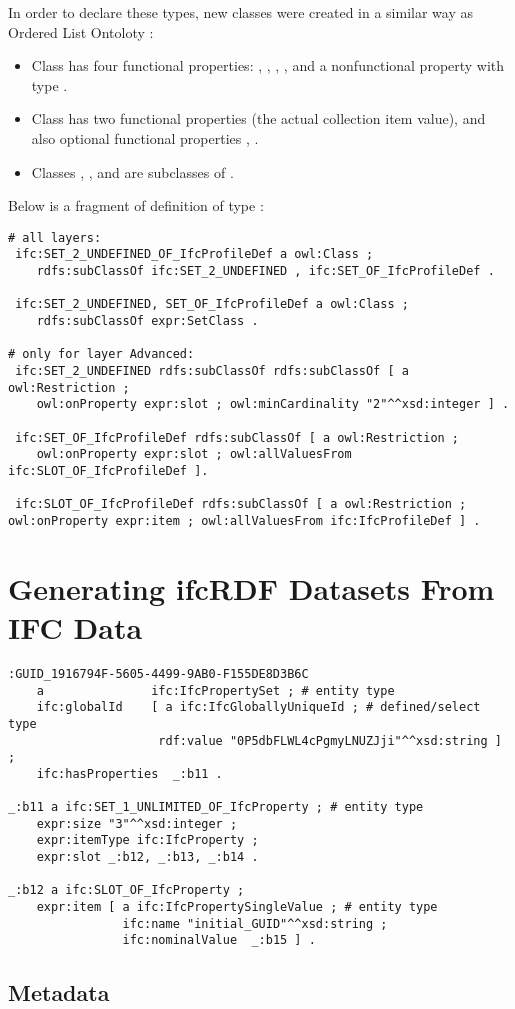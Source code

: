 In order to declare these types, new classes were created in a similar way as Ordered List Ontoloty \cite{olo:ontology}:
\begin{itemize}
\item Class  has four functional properties: , , , ,  and a nonfunctional property  with type .
\item Class  has two functional properties  (the actual collection item value),  and also optional functional properties , .
\item Classes , ,  and  are subclasses of .
\end{itemize}

Below is a fragment of definition of type :

\begin{lstlisting}
# all layers:
 ifc:SET_2_UNDEFINED_OF_IfcProfileDef a owl:Class ;
    rdfs:subClassOf ifc:SET_2_UNDEFINED , ifc:SET_OF_IfcProfileDef .
    
 ifc:SET_2_UNDEFINED, SET_OF_IfcProfileDef a owl:Class ;
    rdfs:subClassOf expr:SetClass .

# only for layer Advanced:
 ifc:SET_2_UNDEFINED rdfs:subClassOf rdfs:subClassOf [ a owl:Restriction ;
    owl:onProperty expr:slot ; owl:minCardinality "2"^^xsd:integer ] .
    
 ifc:SET_OF_IfcProfileDef rdfs:subClassOf [ a owl:Restriction ;
    owl:onProperty expr:slot ; owl:allValuesFrom ifc:SLOT_OF_IfcProfileDef ].

 ifc:SLOT_OF_IfcProfileDef rdfs:subClassOf [ a owl:Restriction ; owl:onProperty expr:item ; owl:allValuesFrom ifc:IfcProfileDef ] .
\end{lstlisting}


\section{Generating ifcRDF Datasets From IFC Data}

\begin{lstlisting}
:GUID_1916794F-5605-4499-9AB0-F155DE8D3B6C
    a               ifc:IfcPropertySet ; # entity type
    ifc:globalId    [ a ifc:IfcGloballyUniqueId ; # defined/select type
                     rdf:value "0P5dbFLWL4cPgmyLNUZJji"^^xsd:string ] ;
    ifc:hasProperties  _:b11 .
    
_:b11 a ifc:SET_1_UNLIMITED_OF_IfcProperty ; # entity type
    expr:size "3"^^xsd:integer ;
    expr:itemType ifc:IfcProperty ;
    expr:slot _:b12, _:b13, _:b14 .
    
_:b12 a ifc:SLOT_OF_IfcProperty ;
    expr:item [ a ifc:IfcPropertySingleValue ; # entity type
                ifc:name "initial_GUID"^^xsd:string ;
                ifc:nominalValue  _:b15 ] .
\end{lstlisting}

\subsection{Metadata}

